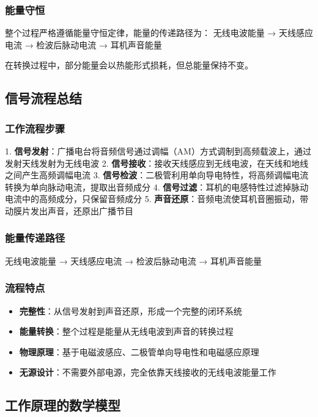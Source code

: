 \documentclass[12pt,UTF8]{ctexbook}
\begin{document}
\subsubsection{能量守恒}
整个过程严格遵循能量守恒定律，能量的传递路径为：
无线电波能量 → 天线感应电流 → 检波后脉动电流 → 耳机声音能量

在转换过程中，部分能量会以热能形式损耗，但总能量保持不变。

\subsection{信号流程总结}

\subsubsection{工作流程步骤}
1. \textbf{信号发射}：广播电台将音频信号通过调幅（AM）方式调制到高频载波上，通过发射天线发射为无线电波
2. \textbf{信号接收}：接收天线感应到无线电波，在天线和地线之间产生高频调幅电流
3. \textbf{信号检波}：二极管利用单向导电特性，将高频调幅电流转换为单向脉动电流，提取出音频成分
4. \textbf{信号过滤}：耳机的电感特性过滤掉脉动电流中的高频成分，只保留音频成分
5. \textbf{声音还原}：音频电流使耳机音圈振动，带动膜片发出声音，还原出广播节目

\subsubsection{能量传递路径}
无线电波能量 → 天线感应电流 → 检波后脉动电流 → 耳机声音能量

\subsubsection{流程特点}
\begin{itemize}
  \item \textbf{完整性}：从信号发射到声音还原，形成一个完整的闭环系统
  \item \textbf{能量转换}：整个过程是能量从无线电波到声音的转换过程
  \item \textbf{物理原理}：基于电磁波感应、二极管单向导电性和电磁感应原理
  \item \textbf{无源设计}：不需要外部电源，完全依靠天线接收的无线电波能量工作
\end{itemize}

\subsection{工作原理的数学模型}
\end{document}
